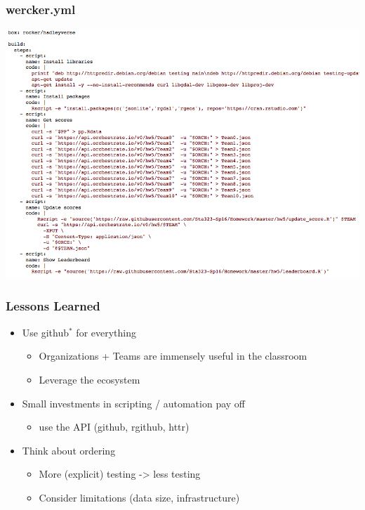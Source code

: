 \documentclass[12pt]{beamer}
\begin{document}
\begin{frame}
\frametitle{wercker.yml}

\includegraphics[width=1.05\textwidth]{imgs/wercker_hw5.yml.png}


\end{frame}


\begin{frame}[t]
\frametitle{Lessons Learned}

\begin{itemize}
\item Use github$^*$ for everything

\begin{itemize}
\item Organizations + Teams are immensely useful in the classroom
\item Leverage the ecosystem
\end{itemize}

\vspace{3mm}

\item Small investments in scripting / automation pay off 
\begin{itemize}
\item use the API (github, rgithub, httr)
\end{itemize}

\vspace{3mm}

\item Think about ordering
\begin{itemize}
\item More (explicit) testing -> less testing
\item Consider limitations (data size, infrastructure)
\end{itemize}

\end{itemize}
    
\end{frame}
\end{document}
